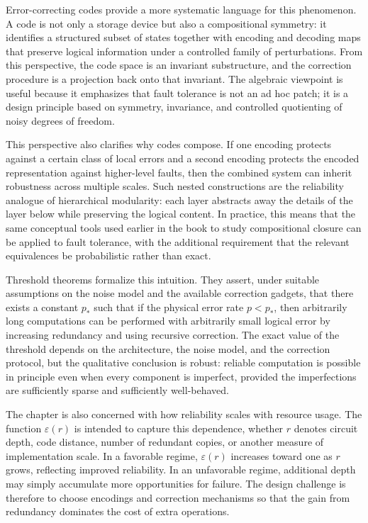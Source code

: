 Error-correcting codes provide a more systematic language for this phenomenon. A code is not only a storage device but also a compositional symmetry: it identifies a structured subset of states together with encoding and decoding maps that preserve logical information under a controlled family of perturbations. From this perspective, the code space is an invariant substructure, and the correction procedure is a projection back onto that invariant. The algebraic viewpoint is useful because it emphasizes that fault tolerance is not an ad hoc patch; it is a design principle based on symmetry, invariance, and controlled quotienting of noisy degrees of freedom.

This perspective also clarifies why codes compose. If one encoding protects against a certain class of local errors and a second encoding protects the encoded representation against higher-level faults, then the combined system can inherit robustness across multiple scales. Such nested constructions are the reliability analogue of hierarchical modularity: each layer abstracts away the details of the layer below while preserving the logical content. In practice, this means that the same conceptual tools used earlier in the book to study compositional closure can be applied to fault tolerance, with the additional requirement that the relevant equivalences be probabilistic rather than exact.

Threshold theorems formalize this intuition. They assert, under suitable assumptions on the noise model and the available correction gadgets, that there exists a constant \(p_{\ast}\) such that if the physical error rate \(p < p_{\ast}\), then arbitrarily long computations can be performed with arbitrarily small logical error by increasing redundancy and using recursive correction. The exact value of the threshold depends on the architecture, the noise model, and the correction protocol, but the qualitative conclusion is robust: reliable computation is possible in principle even when every component is imperfect, provided the imperfections are sufficiently sparse and sufficiently well-behaved.

The chapter is also concerned with how reliability scales with resource usage. The function \(\varepsilon(r)\) is intended to capture this dependence, whether \(r\) denotes circuit depth, code distance, number of redundant copies, or another measure of implementation scale. In a favorable regime, \(\varepsilon(r)\) increases toward one as \(r\) grows, reflecting improved reliability. In an unfavorable regime, additional depth may simply accumulate more opportunities for failure. The design challenge is therefore to choose encodings and correction mechanisms so that the gain from redundancy dominates the cost of extra operations.

